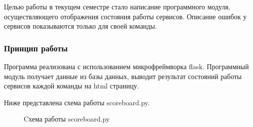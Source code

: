 Целью работы в текущем семестре стало написание программного модуля, осуществляющего отображения состояния работы сервисов. Описание ошибок у сервисов показываются только для своей команды.

\subsubsection{Принцип работы}

Программа реализована с использованием микрофреймворка flask. Программный модуль получает данные из базы данных, выводит результат состояний работы сервисов каждой команды на html страницу.

Ниже представлена схема работы scoreboard.py.

\begin{figure}[ht!]
\caption{Cхема работы scoreboard.py}
\end{figure}

\clearpage